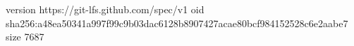 version https://git-lfs.github.com/spec/v1
oid sha256:a48ea50341a997f99c9b03dac6128b8907427acae80bcf984152528c6e2aabe7
size 7687
